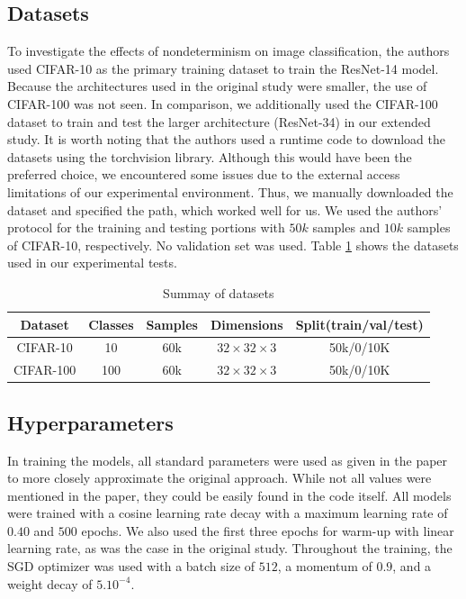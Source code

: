 \subsection{Datasets}
To investigate the effects of nondeterminism on image classification, the authors used CIFAR-10 as the primary training dataset to train the ResNet-14 model. Because the architectures used in the original study were smaller, the use of CIFAR-100 was not seen. In comparison, we additionally used the CIFAR-100 dataset to train and test the larger architecture (ResNet-34) in our extended study. It is worth noting that the authors used a runtime code to download the datasets using the torchvision library. Although this would have been the preferred choice, we encountered some issues due to the external access limitations of our experimental environment. Thus, we manually downloaded the dataset and specified the path, which worked well for us. We used the authors' protocol for the training and testing portions with $50k$ samples and $10k$ samples of CIFAR-10, respectively. No validation set was used. Table \ref{table:table2}  shows the datasets used in our experimental tests.
\begin{table}[!hb]
\centering
	\begin{tabular}{|c|c|c|c|c|}
	\hline
    Dataset & Classes & Samples& Dimensions& Split(train/val/test)\\
	\hline
		CIFAR-10 & 10 & 60k & $32 \times 32 \times 3$ & 50k/0/10K \\
		\rowcolors{}{}{}
	    CIFAR-100 & 100 & 60k & $32 \times 32 \times 3$ & 50k/0/10K \\
		\hline
	\end{tabular}
	\caption{Summay of datasets}
	\label{table:table2}
\end{table}
\subsection{Hyperparameters}
 In training the models, all standard parameters were used as given in the paper to more closely approximate the original approach. While not all values were mentioned in the paper, they could be easily found in the code itself. All models were trained with a cosine learning rate decay \citep{loshchilov2016sgdr} with a maximum learning rate of $0.40$ and  $500$ epochs. We also used the first three epochs for warm-up with linear learning rate, as was the case in the original study. Throughout the training, the SGD optimizer was used with a batch size of $512$, a momentum of $0.9$, and a weight decay of $5.10^{-4}$. 
 
